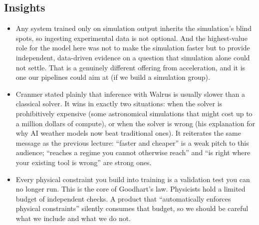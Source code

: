 \documentclass[11pt]{article}
\begin{document}
\subsection*{Insights}
\begin{itemize}
    \item Any system trained only on simulation output inherits the simulation's blind spots, so ingesting experimental data is not optional. And the highest-value role for the model here was not to make the simulation faster but to provide independent, data-driven evidence on a question that simulation alone could not settle. That is a genuinely different offering from acceleration, and it is one our pipelines could aim at (if we build a simulation group).
    \item Cranmer stated plainly that inference with Walrus is usually slower than a classical solver. It wins in exactly two situations: when the solver is prohibitively expensive (some astronomical simulations that might cost up to a million dollars of compute), or when the solver is wrong (his explanation for why AI weather models now beat traditional ones). It reiterates the same message as the previous lecture: ``faster and cheaper'' is a weak pitch to this audience; ``reaches a regime you cannot otherwise reach'' and ``is right where your existing tool is wrong'' are strong ones.
    \item Every physical constraint you build into training is a validation test you can no longer run. This is the core of Goodhart's law. Physicists hold a limited budget of independent checks. A product that ``automatically enforces physical constraints'' silently consumes that budget, so we should be careful what we include and what we do not.
\end{itemize}
\end{document}
